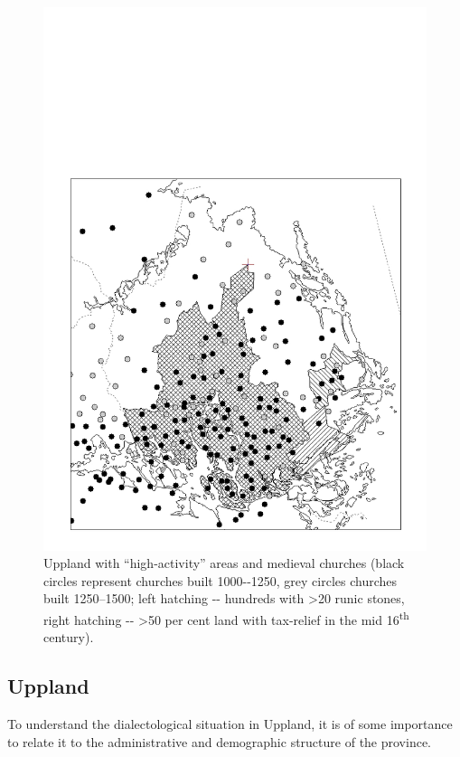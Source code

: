  
\begin{figure}[h]
\includegraphics[height=.5\textheight]{figures/44_UpplandHighActivity}
\caption{Uppland with “high-activity” areas  and medieval churches (black circles represent churches built 1000-{}-1250, grey circles churches built 1250--1500; left hatching  {}-{}- hundreds with {\textgreater}20 runic stones, right hatching  {}-{}- {\textgreater}50 per cent land with tax-relief in the mid 16\textsuperscript{th} century).}
\label{map:38}
\end{figure}

  

\subsection{Uppland}

To understand the dialectological situation in Uppland, it is of some importance to relate it to the administrative and demographic structure of the province.

